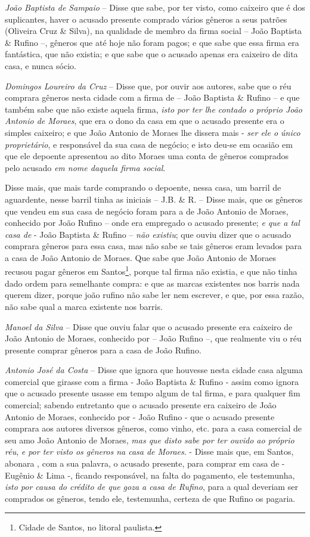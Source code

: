 \emph{João Baptista de Sampaio} -- Disse que sabe, por ter visto, como
caixeiro que é dos suplicantes, haver o acusado presente comprado vários
gêneros a seus patrões (Oliveira Cruz \& Silva), na qualidade de membro
da firma social -- João Baptista \& Rufino --, gêneros que até hoje não
foram pagos; e que sabe que essa firma era fantástica, que não existia;
e que sabe que o acusado apenas era caixeiro de dita casa, e nunca
sócio.

\emph{Domingos Loureiro da Cruz} -- Disse que, por ouvir aos autores,
sabe que o réu comprara gêneros nesta cidade com a firma de -- João
Baptista \& Rufino -- e que também sabe que não existe aquela firma,
\emph{isto por ter lhe contado o próprio João Antonio de Moraes}, que
era o dono da casa em que o acusado presente era o simples caixeiro; e
que João Antonio de Moraes lhe dissera mais - \emph{ser ele o único
proprietário}, e responsável da sua casa de negócio; e isto deu-se em
ocasião em que ele depoente apresentou ao dito Moraes uma conta de
gêneros comprados pelo acusado \emph{em nome daquela firma social}.

Disse mais, que mais tarde comprando o depoente, nessa casa, um barril
de aguardente, nesse barril tinha as iniciais -- J.B. \& R. -- Disse
mais, que os gêneros que vendeu em sua casa de negócio foram para a de
João Antonio de Moraes, conhecido por João Rufino -- onde era empregado
o acusado presente; \emph{e que a tal casa de} - João Baptista \& Rufino
-- \emph{não existiu}; que ouviu dizer que o acusado comprara gêneros
para essa casa, mas não sabe se tais gêneros eram levados para a casa de
João Antonio de Moraes. Que sabe que João Antonio de Moraes recusou
pagar gêneros em Santos\footnote{ Cidade de Santos, no litoral
  paulista.}, porque tal firma não existia, e que não tinha dado ordem
para semelhante compra: e que as marcas existentes nos barris nada
querem dizer, porque joão rufino não sabe ler nem escrever, e que, por
essa razão, não sabe qual a marca existente nos barris.

\emph{Manoel da Silva} -- Disse que ouviu falar que o acusado presente
era caixeiro de João Antonio de Moraes, conhecido por -- João Rufino --,
que realmente viu o réu presente comprar gêneros para a casa de João
Rufino.

\emph{Antonio José da Costa} -- Disse que ignora que houvesse nesta
cidade casa alguma comercial que girasse com a firma - João Baptista \&
Rufino - assim como ignora que o acusado presente usasse em tempo algum
de tal firma, e para qualquer fim comercial; sabendo entretanto que o
acusado presente era caixeiro de João Antonio de Moraes, conhecido por -
João Rufino - que o acusado presente comprara aos autores diversos
gêneros, como vinho, etc. para a casa comercial de seu amo João Antonio
de Moraes, \emph{mas que disto sabe por ter ouvido ao próprio réu},
\emph{e por ter visto os gêneros na casa de Moraes}. - Disse mais que,
em Santos, abonara , com a sua palavra, o acusado presente, para comprar
em casa de - Eugênio \& Lima -, ficando responsável, na falta do
pagamento, ele testemunha, \emph{isto por causa do crédito de que goza a
casa de Rufino}, para a qual deveriam ser comprados os gêneros, tendo
ele, testemunha, certeza de que Rufino os pagaria.


